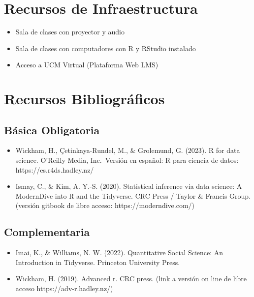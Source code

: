 \documentclass[11pt,letter,]{article}
\providecommand{\tightlist}{%
  \setlength{\itemsep}{0pt}\setlength{\parskip}{0pt}}
\begin{document}
\hypertarget{recursos-de-infraestructura}{%
\section{Recursos de
Infraestructura}\label{recursos-de-infraestructura}}

\begin{itemize}
\tightlist
\item
  Sala de clases con proyector y audio
\item
  Sala de clases con computadores con R y RStudio instalado
\item
  Acceso a UCM Virtual (Plataforma Web LMS)
\end{itemize}

\hypertarget{recursos-bibliogruxe1ficos}{%
\section{Recursos Bibliográficos}\label{recursos-bibliogruxe1ficos}}

\hypertarget{buxe1sica-obligatoria}{%
\subsection{Básica Obligatoria}\label{buxe1sica-obligatoria}}

\begin{itemize}
\tightlist
\item
  Wickham, H., Çetinkaya-Rundel, M., \& Grolemund, G. (2023). R for data
  science. O'Reilly Media, Inc.~Versión en español: R para ciencia de
  datos: https://es.r4ds.hadley.nz/
\item
  Ismay, C., \& Kim, A. Y.-S. (2020). Statistical inference via data
  science: A ModernDive into R and the Tidyverse. CRC Press / Taylor \&
  Francis Group. (versión gitbook de libre acceso:
  https://moderndive.com/)
\end{itemize}

\hypertarget{complementaria}{%
\subsection{Complementaria}\label{complementaria}}

\begin{itemize}
\tightlist
\item
  Imai, K., \& Williams, N. W. (2022). Quantitative Social Science: An
  Introduction in Tidyverse. Princeton University Press.
\item
  Wickham, H. (2019). Advanced r. CRC press. (link a versión on line de
  libre acceso https://adv-r.hadley.nz/)
\end{itemize}
\end{document}
